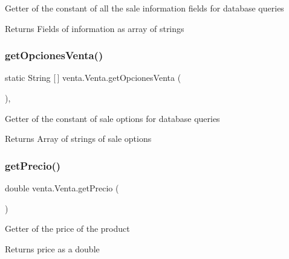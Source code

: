 Getter of the constant of all the sale information fields for database queries

\begin{DoxyReturn}{Returns}
Fields of information as array of strings 
\end{DoxyReturn}
\mbox{\label{classventa_1_1_venta_a9e1fb21792aa11bcf6e5d85e4bc4444d}} 
\subsubsection{\texorpdfstring{get\+Opciones\+Venta()}{getOpcionesVenta()}}
{\footnotesize\ttfamily static String \mbox{[}$\,$\mbox{]} venta.\+Venta.\+get\+Opciones\+Venta (\begin{DoxyParamCaption}{ }\end{DoxyParamCaption})\hspace{0.3cm}{\ttfamily [inline]}, {\ttfamily [static]}}

Getter of the constant of sale options for database queries

\begin{DoxyReturn}{Returns}
Array of strings of sale options 
\end{DoxyReturn}
\mbox{\label{classventa_1_1_venta_a439c68a9611863ddf15f3e3d5ee4fb79}} 
\subsubsection{\texorpdfstring{get\+Precio()}{getPrecio()}}
{\footnotesize\ttfamily double venta.\+Venta.\+get\+Precio (\begin{DoxyParamCaption}{ }\end{DoxyParamCaption})\hspace{0.3cm}{\ttfamily [inline]}}

Getter of the price of the product

\begin{DoxyReturn}{Returns}
price as a double 
\end{DoxyReturn}
\mbox{\label{classventa_1_1_venta_a7ae81f06ac0feabb86e70ae214f896f2}} 
